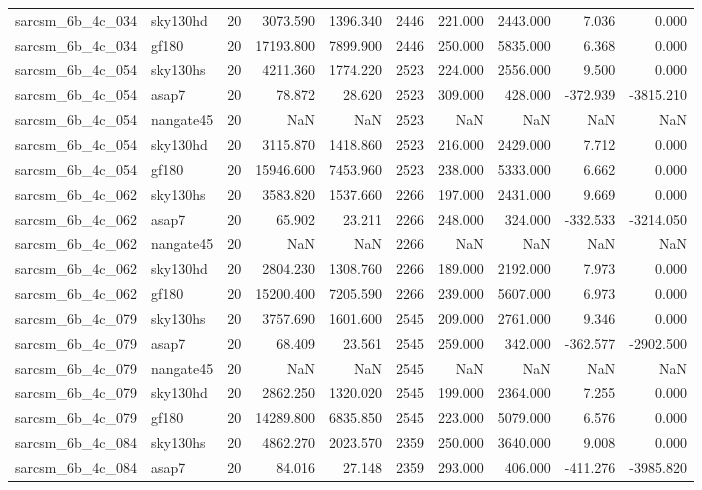 \begin{tabular}{llrrrrrrrr}
sarcsm\_6b\_4c\_034 & sky130hd & 20 & 3073.590 & 1396.340 & 2446 & 221.000 & 2443.000 & 7.036 & 0.000 \\
sarcsm\_6b\_4c\_034 & gf180 & 20 & 17193.800 & 7899.900 & 2446 & 250.000 & 5835.000 & 6.368 & 0.000 \\
sarcsm\_6b\_4c\_054 & sky130hs & 20 & 4211.360 & 1774.220 & 2523 & 224.000 & 2556.000 & 9.500 & 0.000 \\
sarcsm\_6b\_4c\_054 & asap7 & 20 & 78.872 & 28.620 & 2523 & 309.000 & 428.000 & -372.939 & -3815.210 \\
sarcsm\_6b\_4c\_054 & nangate45 & 20 & NaN & NaN & 2523 & NaN & NaN & NaN & NaN \\
sarcsm\_6b\_4c\_054 & sky130hd & 20 & 3115.870 & 1418.860 & 2523 & 216.000 & 2429.000 & 7.712 & 0.000 \\
sarcsm\_6b\_4c\_054 & gf180 & 20 & 15946.600 & 7453.960 & 2523 & 238.000 & 5333.000 & 6.662 & 0.000 \\
sarcsm\_6b\_4c\_062 & sky130hs & 20 & 3583.820 & 1537.660 & 2266 & 197.000 & 2431.000 & 9.669 & 0.000 \\
sarcsm\_6b\_4c\_062 & asap7 & 20 & 65.902 & 23.211 & 2266 & 248.000 & 324.000 & -332.533 & -3214.050 \\
sarcsm\_6b\_4c\_062 & nangate45 & 20 & NaN & NaN & 2266 & NaN & NaN & NaN & NaN \\
sarcsm\_6b\_4c\_062 & sky130hd & 20 & 2804.230 & 1308.760 & 2266 & 189.000 & 2192.000 & 7.973 & 0.000 \\
sarcsm\_6b\_4c\_062 & gf180 & 20 & 15200.400 & 7205.590 & 2266 & 239.000 & 5607.000 & 6.973 & 0.000 \\
sarcsm\_6b\_4c\_079 & sky130hs & 20 & 3757.690 & 1601.600 & 2545 & 209.000 & 2761.000 & 9.346 & 0.000 \\
sarcsm\_6b\_4c\_079 & asap7 & 20 & 68.409 & 23.561 & 2545 & 259.000 & 342.000 & -362.577 & -2902.500 \\
sarcsm\_6b\_4c\_079 & nangate45 & 20 & NaN & NaN & 2545 & NaN & NaN & NaN & NaN \\
sarcsm\_6b\_4c\_079 & sky130hd & 20 & 2862.250 & 1320.020 & 2545 & 199.000 & 2364.000 & 7.255 & 0.000 \\
sarcsm\_6b\_4c\_079 & gf180 & 20 & 14289.800 & 6835.850 & 2545 & 223.000 & 5079.000 & 6.576 & 0.000 \\
sarcsm\_6b\_4c\_084 & sky130hs & 20 & 4862.270 & 2023.570 & 2359 & 250.000 & 3640.000 & 9.008 & 0.000 \\
sarcsm\_6b\_4c\_084 & asap7 & 20 & 84.016 & 27.148 & 2359 & 293.000 & 406.000 & -411.276 & -3985.820 \\

\end{tabular}
